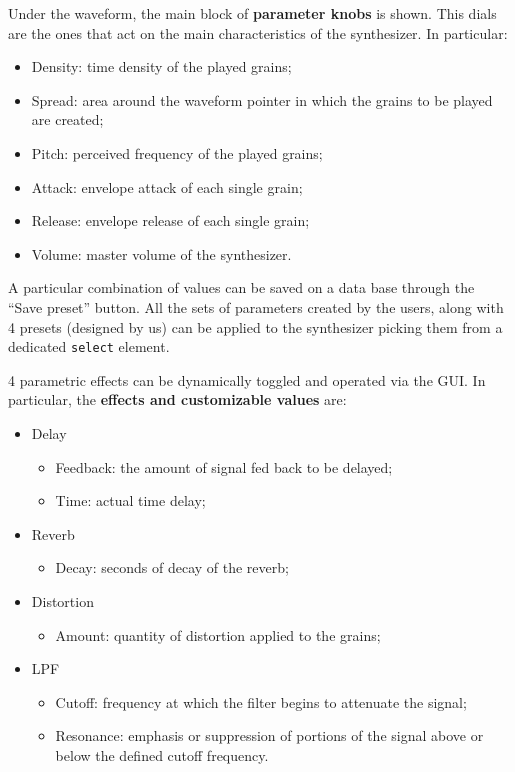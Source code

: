 \documentclass[12pt, a4paper]{article}
\newcommand{\quotes}[1]{``#1''}
\begin{document}
Under the waveform, the main block of \textbf{parameter knobs} is shown. This dials are the ones that act on the main characteristics of the synthesizer. In particular: 
\begin{itemize}
    \item Density: time density of the played grains;
    \item Spread: area around the waveform pointer in which the grains to be played are created;
    \item Pitch: perceived frequency of the played grains;
    \item Attack: envelope attack of each single grain;
    \item Release: envelope release of each single grain;
    \item Volume: master volume of the synthesizer.
\end{itemize}

A particular combination of values can be saved on a data base through the \quotes{Save preset} button. All the sets of parameters created by the users, along with 4 presets (designed by us) can be applied to the synthesizer picking them from a dedicated \texttt{select} element.

4 parametric effects can be dynamically toggled and operated via the GUI. In particular, the \textbf{effects and customizable values} are:

\begin{itemize}
    \item Delay
    \begin{itemize}
        \item Feedback: the amount of signal fed back to be delayed;
        \item Time: actual time delay;
    \end{itemize}
    \item Reverb
    \begin{itemize}
        \item Decay: seconds of decay of the reverb;
    \end{itemize}
    \item Distortion
    \begin{itemize}
        \item Amount: quantity of distortion applied to the grains;
    \end{itemize}
    \item LPF
    \begin{itemize}
        \item Cutoff: frequency at which the filter begins to attenuate the signal;
        \item Resonance: emphasis or suppression of portions of the signal above or below the defined cutoff frequency.
    \end{itemize}
\end{itemize}
\end{document}
